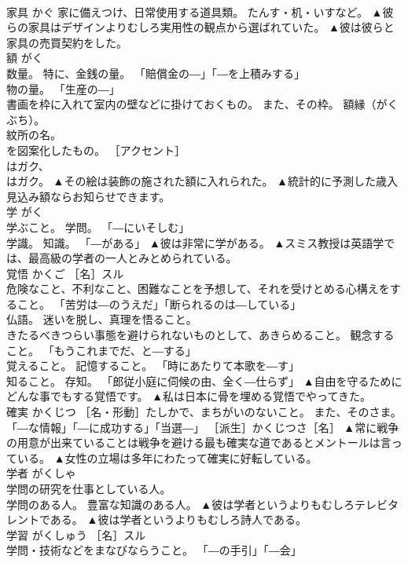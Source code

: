 \documentclass[8pt]{extreport}
\begin{document}
\begin{CJK}{UTF8}{min}
\\	家具	かぐ	家に備えつけ、日常使用する道具類。 たんす・机・いすなど。	▲彼らの家具はデザインよりむしろ実用性の観点から選ばれていた。 ▲彼は彼らと家具の売買契約をした。
\\	額	がく	
\\	数量。 特に、金銭の量。 「賠償金の―」「―を上積みする」 
\\	物の量。 「生産の―」 
\\	書画を枠に入れて室内の壁などに掛けておくもの。 また、その枠。 額縁（がくぶち）。 
\\	紋所の名。 
\\	を図案化したもの。 ［アクセント］ 
\\	はガク、 
\\	はガク。	▲その絵は装飾の施された額に入れられた。 ▲統計的に予測した歳入見込み額ならお知らせできます。
\\	学	がく	
\\	学ぶこと。 学問。 「―にいそしむ」 
\\	学識。 知識。 「―がある」	▲彼は非常に学がある。 ▲スミス教授は英語学では、最高級の学者の一人とみとめられている。
\\	覚悟	かくご	［名］スル 
\\	危険なこと、不利なこと、困難なことを予想して、それを受けとめる心構えをすること。 「苦労は―のうえだ」「断られるのは―している」 
\\	仏語。 迷いを脱し、真理を悟ること。 
\\	きたるべきつらい事態を避けられないものとして、あきらめること。 観念すること。 「もうこれまでだ、と―する」 
\\	覚えること。 記憶すること。 「時にあたりて本歌を―す」 
\\	知ること。 存知。 「郎従小庭に伺候の由、全く―仕らず」	▲自由を守るためにどんな事でもする覚悟です。 ▲私は日本に骨を埋める覚悟でやってきた。
\\	確実	かくじつ	［名・形動］たしかで、まちがいのないこと。 また、そのさま。 「―な情報」「―に成功する」「当選―」 ［派生］かくじつさ［名］	▲常に戦争の用意が出来ていることは戦争を避ける最も確実な道であるとメントールは言っている。 ▲女性の立場は多年にわたって確実に好転している。
\\	学者	がくしゃ	
\\	学問の研究を仕事としている人。 
\\	学問のある人。 豊富な知識のある人。	▲彼は学者というよりもむしろテレビタレントである。 ▲彼は学者というよりもむしろ詩人である。
\\	学習	がくしゅう	［名］スル 
\\	学問・技術などをまなびならうこと。 「―の手引」「―会」 

\end{CJK}
\end{document}
